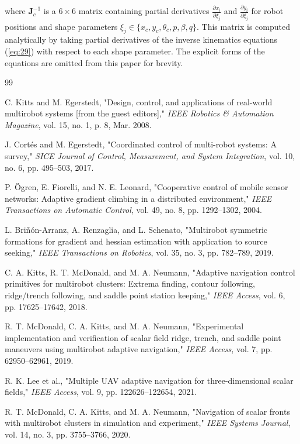 \documentclass[lettersize,journal]{IEEEtran}
\begin{document}
where $\mathbf{J}_c^{-1}$ is a $6 \times 6$ matrix containing partial derivatives $\frac{\partial x_i}{\partial \xi_j}$ and $\frac{\partial y_i}{\partial \xi_j}$ for robot positions and shape parameters $\xi_j \in \{x_c, y_c, \theta_c, p, \beta, q\}$. This matrix is computed analytically by taking partial derivatives of the inverse kinematics equations (\ref{eq:29}) with respect to each shape parameter. The explicit forms of the equations are omitted from this paper for brevity.


\balance
\begin{thebibliography}{99}

 C. Kitts and M. Egerstedt, "Design, control, and applications of real-world multirobot systems [from the guest editors]," \textit{IEEE Robotics \& Automation Magazine}, vol. 15, no. 1, p. 8, Mar. 2008.

 J. Cortés and M. Egerstedt, "Coordinated control of multi-robot systems: A survey," \textit{SICE Journal of Control, Measurement, and System Integration}, vol. 10, no. 6, pp. 495--503, 2017.

 P. Ögren, E. Fiorelli, and N. E. Leonard, "Cooperative control of mobile sensor networks: Adaptive gradient climbing in a distributed environment," \textit{IEEE Transactions on Automatic Control}, vol. 49, no. 8, pp. 1292--1302, 2004.

 L. Briñón-Arranz, A. Renzaglia, and L. Schenato, "Multirobot symmetric formations for gradient and hessian estimation with application to source seeking," \textit{IEEE Transactions on Robotics}, vol. 35, no. 3, pp. 782--789, 2019.

 C. A. Kitts, R. T. McDonald, and M. A. Neumann, "Adaptive navigation control primitives for multirobot clusters: Extrema finding, contour following, ridge/trench following, and saddle point station keeping," \textit{IEEE Access}, vol. 6, pp. 17625--17642, 2018.

 R. T. McDonald, C. A. Kitts, and M. A. Neumann, "Experimental implementation and verification of scalar field ridge, trench, and saddle point maneuvers using multirobot adaptive navigation," \textit{IEEE Access}, vol. 7, pp. 62950--62961, 2019.

 R. K. Lee et al., "Multiple UAV adaptive navigation for three-dimensional scalar fields," \textit{IEEE Access}, vol. 9, pp. 122626--122654, 2021.

 R. T. McDonald, C. A. Kitts, and M. A. Neumann, "Navigation of scalar fronts with multirobot clusters in simulation and experiment," \textit{IEEE Systems Journal}, vol. 14, no. 3, pp. 3755--3766, 2020.


\end{thebibliography}
\end{document}
